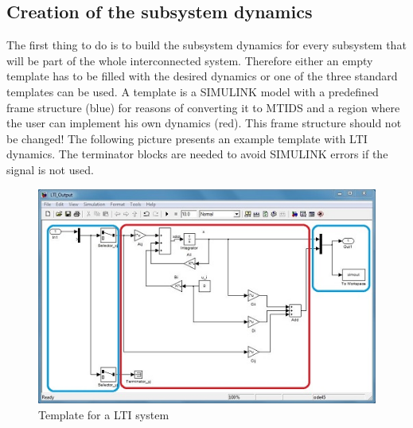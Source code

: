 \documentclass[12pt]{report}
\begin{document}
\subsection{Creation of the subsystem dynamics}
The first thing to do is to build the subsystem dynamics for every subsystem that will be part of the whole interconnected system. Therefore either an empty template has to be filled with the desired dynamics or one of the three standard templates can be used. A template is a SIMULINK model with a predefined frame structure (blue) for reasons of converting it to MTIDS and a region where the user can implement his own dynamics (red). This frame structure should not be changed! The following picture presents an example template with LTI dynamics. The terminator blocks are needed to avoid SIMULINK errors if the signal is not used.\\
\begin{figure}[h]
\centering
\includegraphics[scale=.5]{templateltia}
\caption{Template for a LTI system}
\label{FIG:abb38}
\end{figure}
\\
\end{document}
